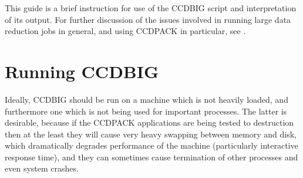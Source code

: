 This guide is a brief instruction for use
of the CCDBIG script and interpretation of its output.
For further discussion of the issues involved in running large
data reduction jobs in general, and using CCDPACK in particular,
see .


\section{Running CCDBIG}

Ideally, CCDBIG should be run on a machine which is not
heavily loaded, and furthermore one which is not being used
for important processes.
The latter is desirable, because if the CCDPACK applications
are being tested to destruction then at the least they will
cause very heavy swapping between memory and disk, which 
dramatically degrades performance of the machine 
(particularly interactive response time),
and they can sometimes cause termination of other processes and
even system crashes.

